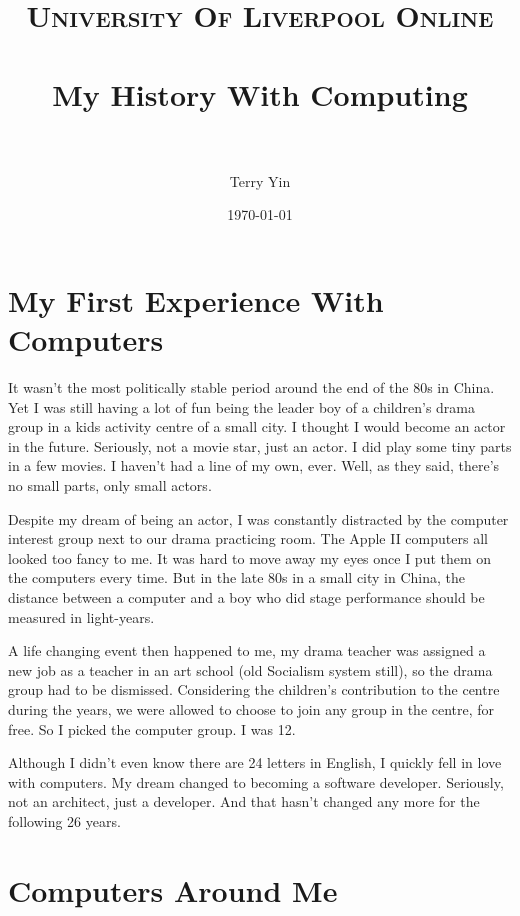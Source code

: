 \documentclass[paper=a4, fontsize=11pt]{scrartcl} %
\title{ 
\normalfont \normalsize 
\textsc{University Of Liverpool Online} \\ [25pt] %
\horrule{0.5pt} \\[0.4cm] %
\huge My History With Computing \\ %
\horrule{2pt} \\[0.5cm] %
}
\author{Terry Yin} %
\date{\normalsize\today} %
\numberwithin{equation}{section} %
\numberwithin{figure}{section} %
\numberwithin{table}{section} %
\begin{document}
\maketitle %


\section{My First Experience With Computers}

It wasn't the most politically stable period around the end of the 80s in China. Yet I was still having a lot of fun being the leader boy of a children's drama group in a kids activity centre of a small city. I thought I would become an actor in the future. Seriously, not a movie star, just an actor. I did play some tiny parts in a few movies. I haven't had a line of my own, ever. Well, as they said, there's no small parts, only small actors.

Despite my dream of being an actor, I was constantly distracted by the computer interest group next to our drama practicing room. The Apple II computers all looked too fancy to me. It was hard to move away my eyes once I put them on the computers every time. But in the late 80s in a small city in China, the distance between a computer and a boy who did stage performance should be measured in light-years.

A life changing event then happened to me, my drama teacher was assigned a new job as a teacher in an art school (old Socialism system still), so the drama group had to be dismissed. Considering the children's contribution to the centre during the years, we were allowed to choose to join any group in the centre, for free. So I picked the computer group. I was 12.

Although I didn't even know there are 24 letters in English, I quickly fell in love with computers. My dream changed to becoming a software developer. Seriously, not an architect, just a developer. And that hasn't changed any more for the following 26 years.

\section{Computers Around Me}
\end{document}
